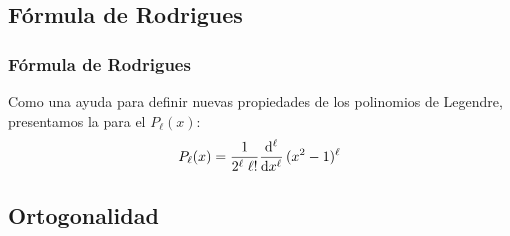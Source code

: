 \documentclass[12pt]{beamer}
\begin{document}

\subsection{Fórmula de Rodrigues}

\begin{frame}
\frametitle{Fórmula de Rodrigues}
Como una ayuda para definir nuevas propiedades de los polinomios de Legendre, presentamos la  para el $P_{\ell} (x)$:
\pause
\begin{align}
P_{\ell} (x) = \dfrac{1}{2^{\ell} \; \ell !} \dv[\ell]{x} \, (x^{2} - 1)^{\ell}
\label{eq:ecuacion_18_09}
\end{align}
\end{frame}

\subsection{Ortogonalidad}
\end{document}
